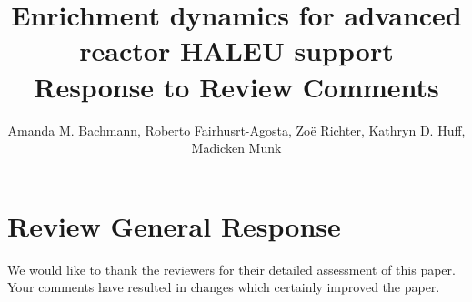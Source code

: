 \documentclass[answers,11pt]{exam}
\begin{document}


%

\title{Enrichment dynamics for advanced reactor HALEU support\\
        \large Response to Review Comments}
\author{Amanda M. Bachmann, Roberto Fairhusrt-Agosta, 
Zo\"{e} Richter, Kathryn D. Huff, Madicken Munk}



%
\maketitle
\section*{Review General Response}
We would like to thank the reviewers for their detailed assessment of this
paper. Your comments have resulted in changes which certainly improved the
paper.
\end{document}
